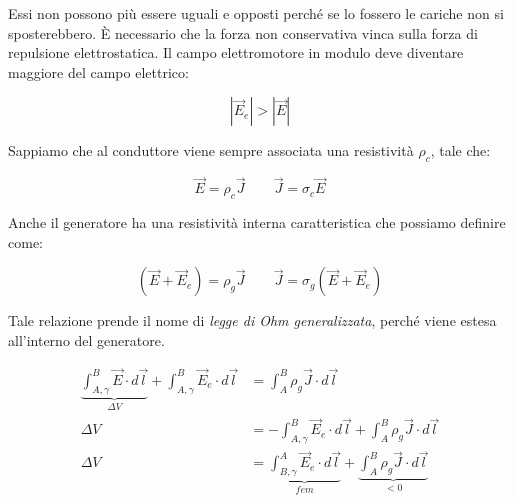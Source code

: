 \begin{figure}[htpb]
\end{figure}
\FloatBarrier

Essi non possono più essere uguali e opposti perché se lo fossero le cariche non si sposterebbero. È necessario che la forza non conservativa vinca sulla forza di repulsione elettrostatica. Il campo elettromotore in modulo deve diventare maggiore del campo elettrico:

\[
	|\vec{E}_e| > |\vec{E}|
\]

Sappiamo che al conduttore viene sempre associata una resistività $ \rho_c  $, tale che:

\[
	\vec{E} = \rho_c\vec{J} \qquad \vec{J} =\sigma_c\vec{E}
\]

Anche il generatore ha una resistività interna caratteristica che possiamo definire come:

\[
	\boxed{(\vec{E} +\vec{E}_e ) = \rho_g\vec{J} \qquad \vec{J} = \sigma_g (\vec{E} + \vec{E}_e )}
\]

Tale relazione prende il nome di \emph{legge di Ohm generalizzata}, perché viene estesa all'interno del generatore.

\begin{align*}
	\underbrace{\int_{A,\gamma}^B \vec{E} \cdot d\vec{l}}_{\Delta V} + \int_{A,\gamma}^B \vec{E}_e\cdot d\vec{l} &= \int_A^B \rho_g \vec{J} \cdot d\vec{l}\\
	\Delta V &= - \int_{A,\gamma}^B \vec{E}_e\cdot d\vec{l} + \int_A^B \rho_g \vec{J} \cdot d\vec{l} \\
	\Delta V &= \underbrace{\int_{B,\gamma}^A \vec{E}_e\cdot d\vec{l}}_{fem} + \underbrace{\int_A^B \rho_g \vec{J} \cdot d\vec{l}}_{<0} \\
\end{align*}

